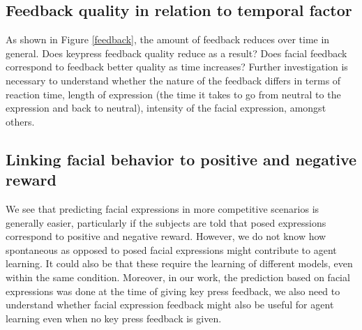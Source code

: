 \subsection{Feedback quality in relation to temporal factor}
As shown in Figure \ref{feedback}, the amount of feedback reduces over time in general. Does keypress feedback quality reduce as a result? Does facial feedback correspond to feedback better quality as time increases? Further investigation is necessary to understand whether the nature of the feedback differs in terms of reaction time, length of expression (the time it takes to go from neutral to the expression and back to neutral), intensity of the facial expression, amongst others.


\subsection{Linking facial behavior to positive and negative reward}
We see that predicting facial expressions in more competitive scenarios is generally easier, particularly if the subjects are told that posed expressions correspond to positive and negative reward. However, we do not know how spontaneous as opposed to posed facial expressions might contribute to agent learning. It could also be that these require the learning of different models, even within the same condition. Moreover, in our work, the prediction based on facial expressions was done at the time of giving key press feedback, we also need to understand whether facial expression feedback might also be useful for agent learning even when no key press feedback is given. 

\vspace{2mm}

